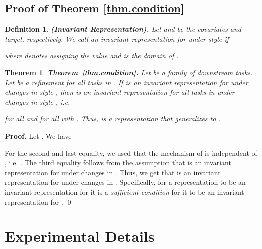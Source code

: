 \documentclass{article}
\newtheorem{theorem*}{Theorem}
\newtheorem{definition}{Definition}
\newenvironment{oneshot}[1]{\begin{theorem*}{#1}{\unskip}}{\end{theorem*}}
\begin{document}
\subsection{Proof of Theorem \ref{thm.condition}}

\begin{definition}{\bf (Invariant Representation).}
Let  and  be the covariates and target, respectively. We call  an invariant representation for  under style  if

where  denotes assigning  the value  and  is the domain of .
\end{definition}

\begin{oneshot}{\bf Theorem~\ref{thm.condition}.}
    Let  be a family of downstream tasks. Let  be a refinement for all tasks in . 
    If  is an invariant representation for  under changes in style , then  is an invariant representation for all tasks in  under changes in style , i.e.
    
    for all  and for all  with . 
Thus,  is a representation that generalizes to .
\end{oneshot}


{\bf Proof.}
Let . We have

For the second and last equality, we used that the mechanism of  is independent of , i.e. . 
The third equality follows from the assumption that  is an invariant representation for  under changes in . 
Thus, we get that  is an invariant representation for  under changes in . Specifically, for a representation to be an invariant representation for  it is a \emph{sufficient condition} for it to be an invariant representation for . \qed \section{Experimental Details} \label{sec:experiments_app}
\end{document}

